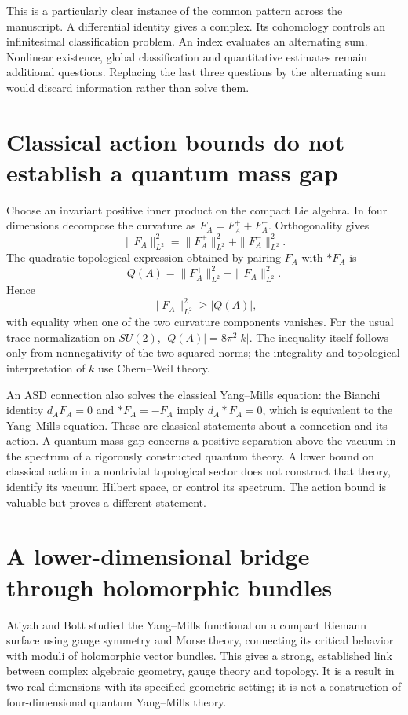 This is a particularly clear instance of the common pattern across the manuscript. A differential identity gives a complex. Its cohomology controls an infinitesimal classification problem. An index evaluates an alternating sum. Nonlinear existence, global classification and quantitative estimates remain additional questions. Replacing the last three questions by the alternating sum would discard information rather than solve them.

\section{Classical action bounds do not establish a quantum mass gap}

Choose an invariant positive inner product on the compact Lie algebra. In four dimensions decompose the curvature as $F_A=F_A^++F_A^-$. Orthogonality gives
\[
\|F_A\|_{L^2}^2=\|F_A^+\|_{L^2}^2+\|F_A^-\|_{L^2}^2.
\]
The quadratic topological expression obtained by pairing $F_A$ with $*F_A$ is
\[
Q(A)=\|F_A^+\|_{L^2}^2-\|F_A^-\|_{L^2}^2.
\]
Hence
\[
\|F_A\|_{L^2}^2\geq|Q(A)|,
\]
with equality when one of the two curvature components vanishes. For the usual trace normalization on $SU(2)$, $|Q(A)|=8\pi^2|k|$. The inequality itself follows only from nonnegativity of the two squared norms; the integrality and topological interpretation of $k$ use Chern--Weil theory.

An ASD connection also solves the classical Yang--Mills equation: the Bianchi identity $d_AF_A=0$ and $*F_A=-F_A$ imply $d_A*F_A=0$, which is equivalent to the Yang--Mills equation. These are classical statements about a connection and its action. A quantum mass gap concerns a positive separation above the vacuum in the spectrum of a rigorously constructed quantum theory. A lower bound on classical action in a nontrivial topological sector does not construct that theory, identify its vacuum Hilbert space, or control its spectrum. The action bound is valuable but proves a different statement.

\section{A lower-dimensional bridge through holomorphic bundles}

Atiyah and Bott studied the Yang--Mills functional on a compact Riemann surface using gauge symmetry and Morse theory, connecting its critical behavior with moduli of holomorphic vector bundles. This gives a strong, established link between complex algebraic geometry, gauge theory and topology. It is a result in two real dimensions with its specified geometric setting; it is not a construction of four-dimensional quantum Yang--Mills theory.\cite{v2AB1983}

